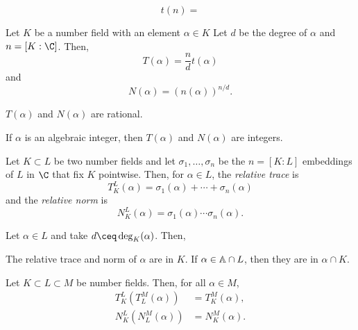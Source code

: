 \begin{definition}
	\begin{equation}
		t(n) =
	\end{equation}
\end{definition}

\begin{theorem}
	Let $K$ be a number field with an element $\alpha \in K$ Let $d$ be the degree of $\alpha$ and $n = [K : \C]$. Then,
	\begin{equation}
		T(\alpha) = \frac n d t (\alpha)
	\end{equation}
	and
	\begin{equation}
		N(\alpha) = (n(\alpha))^{n / d}.
	\end{equation}
\end{theorem}

\begin{corrolary}
	$T(\alpha)$ and $N(\alpha)$ are rational.
\end{corrolary}

\begin{corrolary}
	If $\alpha$ is an algebraic integer, then $T(\alpha)$ and $N(\alpha)$ are integers.
\end{corrolary}

\begin{definition}
	Let $K \subset L$ be two number fields and let $\sigma_1, \ldots, \sigma_n$ be the $n = [K : L]$ embeddings of $L$ in $\C$ that fix $K$ pointwise. Then, for $\alpha \in L$, the \textit{relative trace} is
	\begin{equation}
		T^L_K(\alpha) = \sigma_1(\alpha) + \cdots + \sigma_n(\alpha)
	\end{equation}
	and the \textit{relative norm} is
	\begin{equation}
		N^L_K(\alpha) = \sigma_1(\alpha) \cdots \sigma_n(\alpha).
	\end{equation}
\end{definition}

\begin{theorem}
	Let $\alpha \in L$ and take $d \ceq \deg_K(\alpha)$. Then,
\end{theorem}

\begin{corrolary}
	The relative trace and norm of $\alpha$ are in $K$. If $\alpha \in \mathbb A \cap L$, then they are in $\alpha \cap K$.
\end{corrolary}

\begin{theorem}
	Let $K \subset L \subset M$ be number fields. Then, for all $\alpha \in M$,
	\begin{align}
		T_K^L(T_L^M(\alpha)) & = T_K^M(\alpha), \\
		N_K^L(N_L^M(\alpha)) & = N_K^M(\alpha).
	\end{align}
\end{theorem}

